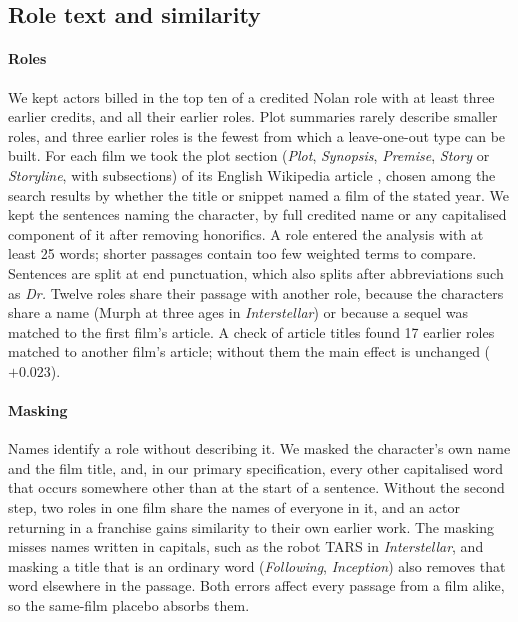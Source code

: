 \documentclass[9pt,twocolumn,twoside]{pnas-new}
\begin{document}
{\subsection*{Role text and similarity}
\paragraph*{Roles} We kept actors billed in the top ten of a credited Nolan role with at least three earlier credits, and all their earlier roles. Plot summaries rarely describe smaller roles, and three earlier roles is the fewest from which a leave-one-out type can be built. For each film we took the plot section (\emph{Plot}, \emph{Synopsis}, \emph{Premise}, \emph{Story} or \emph{Storyline}, with subsections) of its English Wikipedia article \cite{wikipedia}, chosen among the search results by whether the title or snippet named a film of the stated year. We kept the sentences naming the character, by full credited name or any capitalised component of it after removing honorifics. A role entered the analysis with at least 25 words; shorter passages contain too few weighted terms to compare. Sentences are split at end punctuation, which also splits after abbreviations such as \emph{Dr.} Twelve roles share their passage with another role, because the characters share a name (Murph at three ages in \emph{Interstellar}) or because a sequel was matched to the first film's article. A check of article titles found 17 earlier roles matched to another film's article; without them the main effect is unchanged ($+0.023$).

\paragraph*{Masking} Names identify a role without describing it. We masked the character's own name and the film title, and, in our primary specification, every other capitalised word that occurs somewhere other than at the start of a sentence. Without the second step, two roles in one film share the names of everyone in it, and an actor returning in a franchise gains similarity to their own earlier work. The masking misses names written in capitals, such as the robot TARS in \emph{Interstellar}, and masking a title that is an ordinary word (\emph{Following}, \emph{Inception}) also removes that word elsewhere in the passage. Both errors affect every passage from a film alike, so the same-film placebo absorbs them.

}
\end{document}

